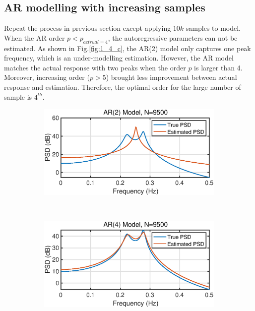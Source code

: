 \subsection{AR modelling with increasing samples}
Repeat the process in previous section except applying $10k$ samples to model. When the AR order $p < p_{actrual =4}$, the autoregressive parameters can not be estimated. As shown in Fig.\ref{fig:1_4_c}, the AR(2) model only captures one peak frequency, which is an under-modelling estimation. However, the AR model matches the actual response with two peaks when the order $p$ is larger than 4. Moreover, increasing order ($p>5$) brought less improvement between actual response and estimation. Therefore, the optimal order for the large number of sample is $4^{th}$.
\begin{figure}[htbp]
     \centering
     \begin{subfigure}[b]{0.35\textwidth}
         \centering
         \includegraphics[width=\textwidth]{fig/14/14c1.eps}
     \end{subfigure}
     ~
     \begin{subfigure}[b]{0.35\textwidth}
         \centering
         \includegraphics[width=\textwidth]{fig/14/14c2.eps}
     \end{subfigure}

\end{figure}
